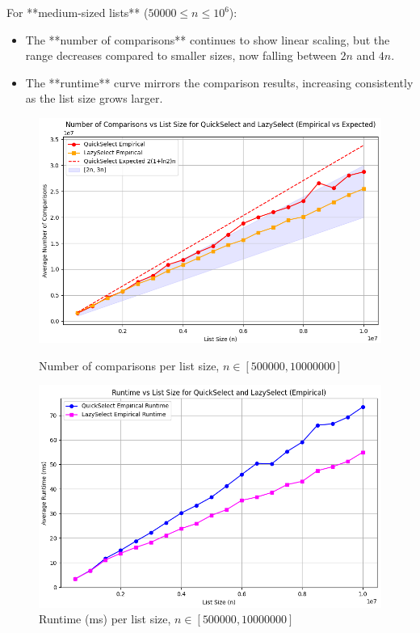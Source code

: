 \documentclass{article}
\begin{document}
\noindent For **medium-sized lists** (\(50000 \leq n \leq 10^6\)):
\begin{itemize}
    \item The **number of comparisons** continues to show linear scaling, but the range decreases compared to smaller sizes, now falling between \(2n\) and \(4n\).
    \item The **runtime** curve mirrors the comparison results, increasing consistently as the list size grows larger.
\end{itemize}

\begin{figure}[H]
    \centering
    \begin{minipage}{0.45\textwidth}
        \centering
        \includegraphics[width=\textwidth]{assets1/graphics/comparisons_results_500000_10000000_500000_100.png}
        \caption{Number of comparisons per list size, $n \in [500000, 10000000]$}
    \end{minipage}
    \hfill
    \begin{minipage}{0.45\textwidth}
        \centering
        \includegraphics[width=\textwidth]{assets1/graphics/runtime_results_500000_10000000_500000_100.png}
        \caption{Runtime (ms) per list size, $n \in [500000, 10000000]$}
    \end{minipage}
\end{figure}
\end{document}
